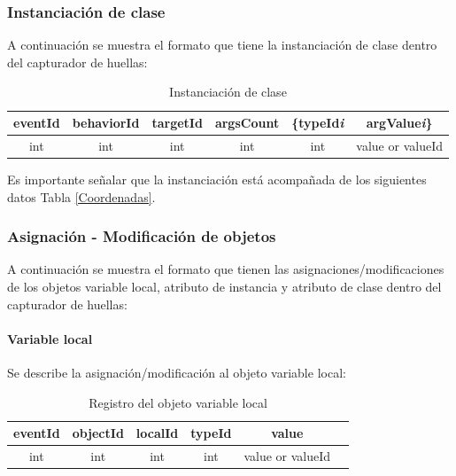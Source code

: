 \documentclass[12pt,legalpaper]{report}
\begin{document}
			\subsubsection{Instanciación de clase}

A continuación se muestra el formato que tiene la instanciación de clase dentro del capturador de huellas:\\

\begin{table}[!h]
\begin{center}
\begin{tabular}{| c | c | c | c | c | c |}
\hline
\rowcolor[gray]{0.9}eventId & behaviorId & targetId & argsCount & \{typeId\textit{{\scriptsize  i}} & argValue\textit{{\scriptsize  i}}\}\\
\hline
int & int & int & int & int & value or valueId\footnotemark[1]\\
\hline
\end{tabular}
\caption{Instanciación de clase} 
\end{center}
\end{table}

Es importante señalar que la instanciación está acompañada de los siguientes datos Tabla \ref{Coordenadas}.


			\subsubsection{Asignación - Modificación de objetos}
A continuación se muestra el formato que tienen las asignaciones/modificaciones de los objetos variable local, atributo de instancia y atributo de clase dentro del capturador de huellas:\\

				\paragraph{Variable local}

Se describe la asignación/modificación al objeto variable local:\\

\begin{table}[!h]
\begin{center}
\begin{tabular}{| c | c | c | c | c | c |}
\hline
\rowcolor[gray]{0.9}eventId & objectId & localId & typeId & value\\
\hline
int & int & int & int & value or valueId\footnotemark[1]\\
\hline
\end{tabular}
\caption{Registro del objeto variable local} 
\end{center}
\end{table}
\end{document}
